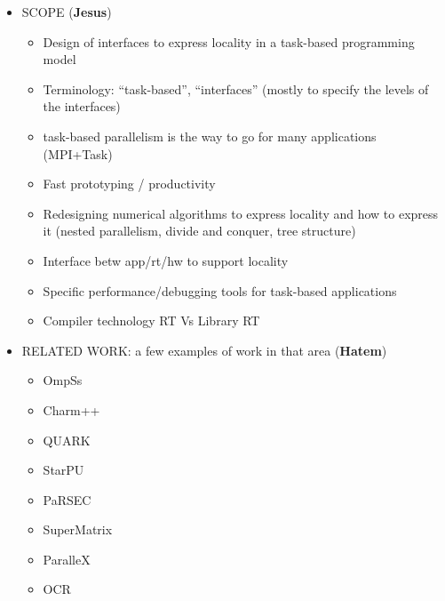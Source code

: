 \begin{itemize}


	\item SCOPE (\textbf{Jesus})
	\begin{itemize}
		\item Design of interfaces to express
		      locality in a task-based programming model
		\item Terminology: ``task-based'', ``interfaces'' (mostly to specify the levels of the interfaces)
		\item task-based parallelism is the way to go for many applications (MPI+Task)
		\item Fast prototyping / productivity
		\item Redesigning numerical algorithms to express locality
		and how to express it (nested parallelism, divide and conquer, tree structure)
		\item Interface betw app/rt/hw to support locality
		\item Specific performance/debugging tools for task-based applications
		\item Compiler technology RT Vs Library RT
	\end{itemize}



	\item RELATED WORK: a few examples of work in that area  (\textbf{Hatem})
	\begin{itemize}
		\item OmpSs
		\item Charm++
		\item QUARK
		\item StarPU
		\item PaRSEC
		\item SuperMatrix
		\item ParalleX
		\item OCR
	\end{itemize}



\end{itemize}
